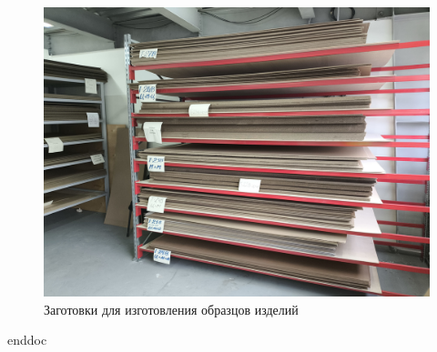 \begin{figure}
\begin{center}
 \includegraphics[height=0.5\textheight, keepaspectratio]{Pics/II заготовки для образцов.jpg}
\end{center}
 \caption{Заготовки для изготовления образцов изделий}
 \label{pic:II заготовки для образцов}
\end{figure}
\clearpage
 {enddoc}